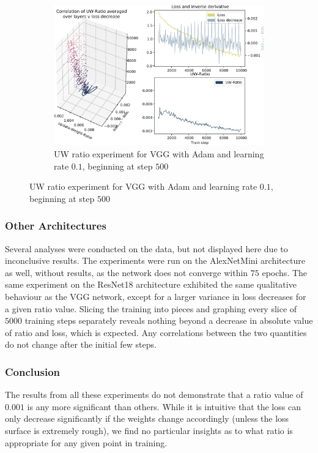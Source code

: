 \begin{figure}
    \begin{subfigure}{\textwidth}
        \centering
        \includegraphics[width=\linewidth]{gfx/diagrams/experiments/ratio_loss_correlation/vgg_adam_01_500_10000.pdf}
        \caption{UW ratio experiment for VGG with Adam and learning rate $0.1$,
        beginning at step $500$}
        \label{fig:ratio_loss_corr_vgg_adam_01_500}
    \end{subfigure}
\end{figure}

\subsubsection{Other Architectures}

Several analyses were conducted on the data, but not displayed here due to
inconclusive results.
The experiments were run on the AlexNetMini architecture as well, without
results, as the network does not converge within $75$ epochs.
The same experiment on the ResNet18 architecture exhibited the same qualitative
behaviour as the VGG network, except for a larger variance in loss decreases for
a given ratio value. Slicing the training into pieces and graphing every slice
of $5000$ training steps separately reveals nothing beyond a decrease in
absolute value of ratio and loss, which is expected. Any correlations between
the two quantities do not change after the initial few steps.

\subsubsection{Conclusion}

The results from all these experiments do not demonstrate that a ratio value
of $0.001$ is any more significant than others. While it is intuitive that the loss
can only decrease significantly if the weights change accordingly (unless the
loss surface is extremely rough), we find no particular insights as to what
ratio is appropriate for any given point in training.

